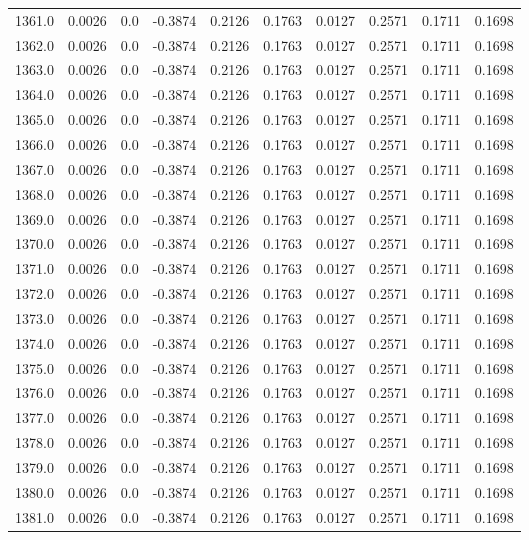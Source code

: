 \begin{longtable}{lrrrrrrrrr}
1361.0 & 0.0026 & 0.0 & -0.3874 & 0.2126 & 0.1763 & 0.0127 & 0.2571 & 0.1711 & 0.1698 \\
1362.0 & 0.0026 & 0.0 & -0.3874 & 0.2126 & 0.1763 & 0.0127 & 0.2571 & 0.1711 & 0.1698 \\
1363.0 & 0.0026 & 0.0 & -0.3874 & 0.2126 & 0.1763 & 0.0127 & 0.2571 & 0.1711 & 0.1698 \\
1364.0 & 0.0026 & 0.0 & -0.3874 & 0.2126 & 0.1763 & 0.0127 & 0.2571 & 0.1711 & 0.1698 \\
1365.0 & 0.0026 & 0.0 & -0.3874 & 0.2126 & 0.1763 & 0.0127 & 0.2571 & 0.1711 & 0.1698 \\
1366.0 & 0.0026 & 0.0 & -0.3874 & 0.2126 & 0.1763 & 0.0127 & 0.2571 & 0.1711 & 0.1698 \\
1367.0 & 0.0026 & 0.0 & -0.3874 & 0.2126 & 0.1763 & 0.0127 & 0.2571 & 0.1711 & 0.1698 \\
1368.0 & 0.0026 & 0.0 & -0.3874 & 0.2126 & 0.1763 & 0.0127 & 0.2571 & 0.1711 & 0.1698 \\
1369.0 & 0.0026 & 0.0 & -0.3874 & 0.2126 & 0.1763 & 0.0127 & 0.2571 & 0.1711 & 0.1698 \\
1370.0 & 0.0026 & 0.0 & -0.3874 & 0.2126 & 0.1763 & 0.0127 & 0.2571 & 0.1711 & 0.1698 \\
1371.0 & 0.0026 & 0.0 & -0.3874 & 0.2126 & 0.1763 & 0.0127 & 0.2571 & 0.1711 & 0.1698 \\
1372.0 & 0.0026 & 0.0 & -0.3874 & 0.2126 & 0.1763 & 0.0127 & 0.2571 & 0.1711 & 0.1698 \\
1373.0 & 0.0026 & 0.0 & -0.3874 & 0.2126 & 0.1763 & 0.0127 & 0.2571 & 0.1711 & 0.1698 \\
1374.0 & 0.0026 & 0.0 & -0.3874 & 0.2126 & 0.1763 & 0.0127 & 0.2571 & 0.1711 & 0.1698 \\
1375.0 & 0.0026 & 0.0 & -0.3874 & 0.2126 & 0.1763 & 0.0127 & 0.2571 & 0.1711 & 0.1698 \\
1376.0 & 0.0026 & 0.0 & -0.3874 & 0.2126 & 0.1763 & 0.0127 & 0.2571 & 0.1711 & 0.1698 \\
1377.0 & 0.0026 & 0.0 & -0.3874 & 0.2126 & 0.1763 & 0.0127 & 0.2571 & 0.1711 & 0.1698 \\
1378.0 & 0.0026 & 0.0 & -0.3874 & 0.2126 & 0.1763 & 0.0127 & 0.2571 & 0.1711 & 0.1698 \\
1379.0 & 0.0026 & 0.0 & -0.3874 & 0.2126 & 0.1763 & 0.0127 & 0.2571 & 0.1711 & 0.1698 \\
1380.0 & 0.0026 & 0.0 & -0.3874 & 0.2126 & 0.1763 & 0.0127 & 0.2571 & 0.1711 & 0.1698 \\
1381.0 & 0.0026 & 0.0 & -0.3874 & 0.2126 & 0.1763 & 0.0127 & 0.2571 & 0.1711 & 0.1698 \\

\end{longtable}
